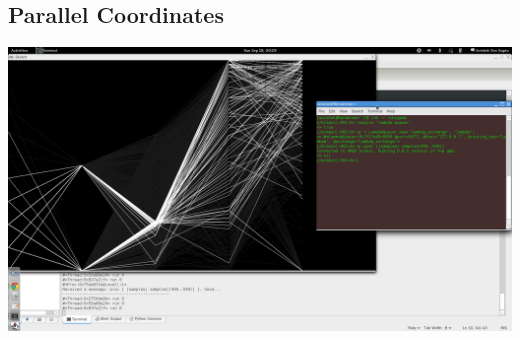 \documentclass[10pt]{article}
\begin{document}
\subsection{Parallel Coordinates}
\includegraphics[width=150mm]{ReportMedia/ParallelCoordinates.jpg}\\
\newpage
\end{document}
